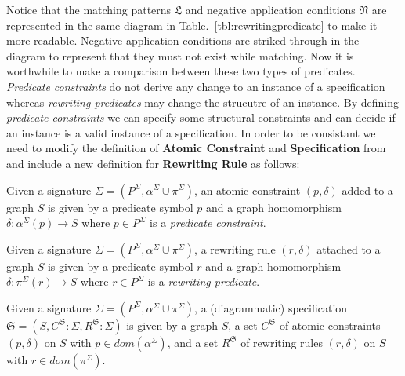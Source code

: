 \documentclass{eceasst}
\begin{document}
Notice that the matching patterns $\mathfrak{L} $ and negative application conditions $\mathfrak{N} $ are represented in the same diagram in 
Table.~\ref{tbl:rewritingpredicate} to make it more readable. Negative application conditions are striked through in the diagram to represent that they must not exist while matching. 
Now it is worthwhile to make a comparison between these two types of predicates. 
\textit{Predicate constraints} do not derive any change to an instance of a specification whereas \textit{rewriting predicates} may change the strucutre of an instance. 
By defining \textit{predicate constraints} we can specify some structural constraints and can decide if an instance is a valid instance of a specification. 
In order to be consistant we need to modify the definition of \textbf{Atomic Constraint} and \textbf{Specification} from \cite{Rutle10} and include a new definition for \textbf{Rewriting Rule} as follows:


\begin{definition}
 Given a signature $\Sigma = (P^\Sigma, \alpha^\Sigma \cup \pi^\Sigma)$, an atomic constraint $(p, \delta)$ added to a graph $S$ is given by a predicate symbol $p$ and a graph 
 homomorphism $\delta : \alpha^{\Sigma}(p) \rightarrow S$ where $p \in P^\Sigma$ is a \textit{predicate constraint}. 
\end{definition}



\begin{definition}
 Given a signature $\Sigma = (P^\Sigma, \alpha^\Sigma \cup \pi^\Sigma)$, a rewriting rule $(r, \delta)$ attached to a graph $S$ is given by a predicate symbol $r$ and a graph 
 homomorphism $\delta : \pi^{\Sigma}(r) \rightarrow S$ where $r \in P^\Sigma$ is a \textit{rewriting predicate}. 
\end{definition}


\begin{definition}[Specification]
 Given a signature $\Sigma = (P^\Sigma, \alpha^\Sigma \cup \pi^\Sigma)$, a (diagrammatic) specification $\mathfrak{S} = (S, C^{\mathfrak{S}}:\Sigma, R^{\mathfrak{S}}:\Sigma )$ 
 is given by 
 a graph $S$, 
 a set $C^\mathfrak{S}$ of atomic constraints $(p, \delta)$ on $S$ with $p \in dom(\alpha^\Sigma)$, and
 a set $R^\mathfrak{S}$ of rewriting rules $(r, \delta)$ on $S$ with $r \in dom(\pi^\Sigma)$. 

\end{definition}
\end{document}
